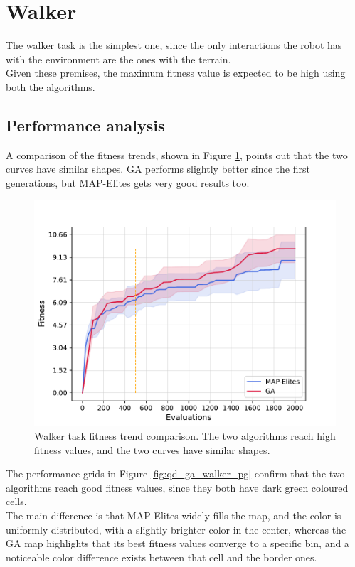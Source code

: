 \section{Walker}
The walker task is the simplest one, since the only interactions the robot has with the environment are the ones with the terrain.\\
Given these premises, the maximum fitness value is expected to be high using both the algorithms.

\subsection{Performance analysis}
A comparison of the fitness trends, shown in Figure \ref{fig:qd_ga_walker_ft}, points out that the two curves have similar shapes. GA performs slightly better since the first generations, but MAP-Elites gets very good results too.

\begin{figure}[h]
    \centering
    \includegraphics[scale=0.65]{images/body_opt/comp_qd_ga_w_ft}
    \caption{Walker task fitness trend comparison. The two algorithms reach high fitness values, and the two curves have similar shapes.}
    \label{fig:qd_ga_walker_ft}
\end{figure}

The performance grids in Figure \ref{fig:qd_ga_walker_pg} confirm that the two algorithms reach good fitness values, since they both have dark green coloured cells.\\
The main difference is that MAP-Elites widely fills the map, and the color is uniformly distributed, with a slightly brighter color in the center, whereas the GA map highlights that its best fitness values converge to a specific bin, and a noticeable color difference exists between that cell and the border ones.

